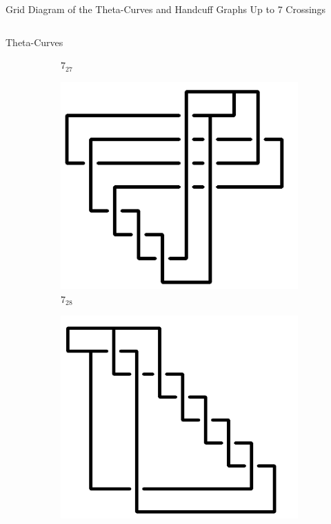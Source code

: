 \documentclass[final]{beamer}
\begin{document}
\begin{frame}[t]
\begin{alertblock}{Grid Diagram of the Theta-Curves and Handcuff Graphs Up to 7 Crossings}
\begin{columns}[t]
\begin{column}{0.5\textwidth}
\begin{alertblock}{Theta-Curves}
\begin{figure}
\begin{subfigure}{0.075\textwidth}
    \caption{$7_{27}$} 
    \end{subfigure}
    \begin{subfigure}{0.075\textwidth}
    \includegraphics[width=\columnwidth]{../Midterm_Poster/grid_diagram/theta_7_28.png}
    \caption{$7_{28}$} 
    \end{subfigure}
    \begin{subfigure}{0.075\textwidth}
    \includegraphics[width=\columnwidth]{../Midterm_Poster/grid_diagram/theta_7_29.png}

\end{subfigure}
\end{figure}
\end{alertblock}
\end{column}
\end{columns}
\end{alertblock}
\end{frame}
\end{document}

